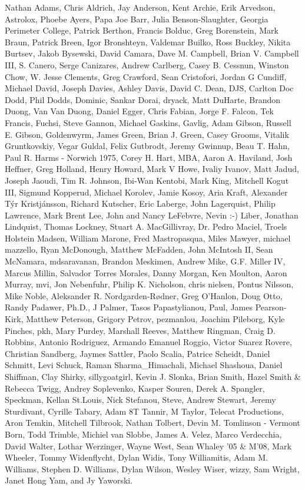 \documentclass[11pt,final]{book}
\begin{document}
\begin{description}
Nathan Adams,
Chris Aldrich,
Jay Anderson,
Kent Archie,
Erik Arvedson,
Astrolox,
Phoebe Ayers,
Papa Joe Barr,
Julia Benson-Slaughter, Georgia Perimeter College,
Patrick Berthon,
Francis Bolduc,
Greg Borenstein,
Mark Braun,
Patrick Breen,
Igor Bronshteyn,
Valdemar Buil\-ko,
Ross Buckley,
Nikita Burtsev,
Jakob Bysewski,
David Camara,
Dave M. Campbell,
Brian V. Campbell III,
S. Canero,
Serge Canizares,
Andrew Carlberg,
Casey B. Cessnun,
Winston Chow,
W. Jesse Clements,
Greg Crawford,
Sean Cristofori,
Jordan G Cundiff,
Michael David,
Joseph Davies,
Ashley Davis,
David C. Dean,
DJS,
Carlton Doc Dodd,
Phil Dodds,
Dominic,
Sankar Dorai,
dryack,
Matt DuHarte,
Brandon Duong,
Van Van Duong,
Daniel Egger,
Chris Fabian,
Jorge F. Falcon,
Tek Francis,
Fuchsi,
Steve Gannon,
Michael Gaskins,
Gavlig,
Adam Gibson,
Russell E. Gibson,
Goldenwyrm,
James Green,
Brian J. Green,
Casey Grooms,
Vitalik Gruntkovskiy,
Vegar Guldal,
Felix Gutbrodt,
Jeremy Gwinnup,
Beau T. Hahn,
Paul R. Harms - Norwich 1975,
Corey H. Hart, MBA,
Aaron A. Haviland,
Josh Heffner,
Greg Holland,
Henry Howard,
Mark V Howe,
Ivaliy Ivanov,
Matt Jadud,
Joseph Jaoudi,
Tim R. Johnson,
Ibi-Wan Kentobi,
Mark King,
Mitchell Kogut III,
Sigmund Kopperud,
Michael Korolev,
Jamie Kosoy,
Aria Kraft,
Alexander T{\'{y}}r Kristj{\'{a}}nsson,
Richard Kutscher,
Eric Laberge,
John Lagerquist,
Philip Lawrence,
Mark Brent Lee,
John and Nancy LeFebvre,
Nevin :-) Liber,
Jonathan Lindquist,
Thomas Lockney,
Stuart A. MacGillivray,
Dr. Pedro Maciel,
Troels Holstein Madsen,
William Marone,
Fred Mastropasqua,
Miles Mawyer,
michael mazzello,
Ryan McDonough,
Matthew McFadden,
John McIntosh II,
Sean McNamara,
mdsaravanan,
Brandon Meskimen,
Andrew Mike,
G.F. Miller IV,
Marcus Millin,
Salvador Torres Morales,
Danny Morgan,
Ken Moulton,
Aaron Murray,
mvi,
Jon Nebenfuhr,
Philip K. Nicholson,
chris nielsen,
Pontus Nilsson,
Mike Noble,
Aleksander R. Nord\-gar\-den-R{\o}d\-ner,
Greg O'Han\-lon,
Doug Otto,
Randy Padawer, Ph.D.,
J Palmer,
Tasos Papastylianou,
Paul,
James Pearson-Kirk,
Matthew Peterson,
Grigory Petrov,
pezmanlou,
Joachim Pileborg,
Kyle Pinches,
pkh,
Mary Purdey,
Marshall Reeves,
Matthew Ringman,
Craig D. Robbins,
Antonio Rodriguez,
Armando Emanuel Roggio,
Victor Suarez Rovere,
Christian Sandberg,
Jaymes Sattler,
Paolo Scalia,
Patrice Scheidt,
Daniel Schmitt,
Levi Schuck,
Raman Sharma\_Himachali,
Michael Shashoua,
Daniel Shiffman,
Clay Shirky,
sillygoatgirl,
Kevin J. Slonka,
Brian Smith,
Hazel Smith \& Rebecca Twigg,
Andrey Soplevenko,
Kasper Souren,
Derek A. Spangler,
Speckman,
Kellan St.Louis,
Nick Stefanou,
Steve,
Andrew Stewart,
Jeremy Sturdivant,
Cyrille Tabary,
Adam 8T Tannir,
M Taylor,
Telecat Productions,
Aron Temkin,
Mitchell Tilbrook,
Nathan Tolbert,
Devin M. Tomlinson - Vermont Born,
Todd Trimble,
Michiel van Slobbe,
James A. Velez,
Marco Verdecchia,
David Walter,
Lothar Werzinger,
Wayne West,
Sean Whaley '05 \& M'08,
Mark Wheeler,
Tommy Widenflycht,
Dylan Widis,
Tony Williamitis,
Adam M. Williams,
Stephen D. Williams,
Dylan Wilson,
Wesley Wiser,
wizzy,
Sam Wright,
Janet Hong Yam,
and
Jy Yaworski.


 \end{description}
\end{document}
